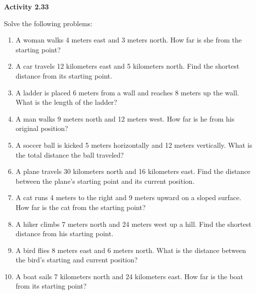 \vspace{0.3ex}
\noindent\textbf{Activity 2.33}

\vspace{0.2ex}

Solve the following problems:
\begin{enumerate}[label = \color{blue}\arabic*. ]
    \item A woman walks 4 meters east and 3 meters north. How far is she from the starting point?
    \item A car travels 12 kilometers east and 5 kilometers north. Find the shortest distance from its starting point.
    \item A ladder is placed 6 meters from a wall and reaches 8 meters up the wall. What is the length of the ladder?
    \item A man walks 9 meters north and 12 meters west. How far is he from his original position?
    \item A soccer ball is kicked 5 meters horizontally and 12 meters vertically. What is the total distance the ball traveled?
    \item A plane travels 30 kilometers north and 16 kilometers east. Find the distance between the plane’s starting point and its current position.
    \item A cat runs 4 meters to the right and 9 meters upward on a sloped surface. How far is the cat from the starting point?
    \item A hiker climbs 7 meters north and 24 meters west up a hill. Find the shortest distance from his starting point.
    \item A bird flies 8 meters east and 6 meters north. What is the distance between the bird’s starting and current position?
    \item A boat sails 7 kilometers north and 24 kilometers east. How far is the boat from its starting point?
\end{enumerate}

